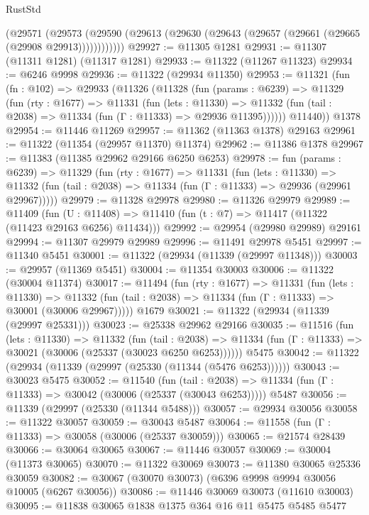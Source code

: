 \begin{lexlean}{RustStd}
\begin{coremodule}
        (@29571
          (@29573 (@29590 (@29613 (@29630 (@29643 (@29657 (@29661 (@29665 (@29908 @29913))))))))))))
@29927 := @11305 @1281
@29931 := @11307 (@11311 @1281) (@11317 @1281)
@29933 := @11322 (@11267 @11323)
@29934 := @6246 @9998
@29936 := @11322 (@29934 @11350)
@29953 := @11321
    (fun (fn : @102) =>
    @29933
      (@11326
        (@11328
          (fun (params : @6239) =>
          @11329
            (fun (rty : @1677) =>
            @11331
              (fun (lets : @11330) =>
              @11332 (fun (tail : @2038) => @11334 (fun (Γ : @11333) => @29936 @11395))))))
        @11440))
    @1378
@29954 := @11446 @11269
@29957 := @11362 (@11363 @1378) @29163
@29961 := @11322 (@11354 (@29957 @11370) @11374)
@29962 := @11386 @1378
@29967 := @11383 (@11385 @29962 @29166 @6250 @6253)
@29978 := fun (params : @6239) =>
  @11329
    (fun (rty : @1677) =>
    @11331
      (fun (lets : @11330) =>
      @11332 (fun (tail : @2038) => @11334 (fun (Γ : @11333) => @29936 (@29961 @29967)))))
@29979 := @11328 @29978
@29980 := @11326 @29979
@29989 := @11409
    (fun (U : @11408) => @11410 (fun (t : @7) => @11417 (@11322 (@11423 @29163 @6256) @11434)))
@29992 := @29954 (@29980 @29989) @29161
@29994 := @11307 @29979 @29989
@29996 := @11491 @29978 @5451
@29997 := @11340 @5451
@30001 := @11322 (@29934 (@11339 (@29997 @11348)))
@30003 := @29957 (@11369 @5451)
@30004 := @11354 @30003
@30006 := @11322 (@30004 @11374)
@30017 := @11494
    (fun (rty : @1677) =>
    @11331
      (fun (lets : @11330) =>
      @11332 (fun (tail : @2038) => @11334 (fun (Γ : @11333) => @30001 (@30006 @29967)))))
    @1679
@30021 := @11322 (@29934 (@11339 (@29997 @25331)))
@30023 := @25338 @29962 @29166
@30035 := @11516
    (fun (lets : @11330) =>
    @11332
      (fun (tail : @2038) =>
      @11334 (fun (Γ : @11333) => @30021 (@30006 (@25337 (@30023 @6250 @6253))))))
    @5475
@30042 := @11322 (@29934 (@11339 (@29997 (@25330 (@11344 (@5476 @6253))))))
@30043 := @30023 @5475
@30052 := @11540
    (fun (tail : @2038) => @11334 (fun (Γ : @11333) => @30042 (@30006 (@25337 (@30043 @6253)))))
    @5487
@30056 := @11339 (@29997 (@25330 (@11344 @5488)))
@30057 := @29934 @30056
@30058 := @11322 @30057
@30059 := @30043 @5487
@30064 := @11558 (fun (Γ : @11333) => @30058 (@30006 (@25337 @30059)))
@30065 := @21574 @28439
@30066 := @30064 @30065
@30067 := @11446 @30057
@30069 := @30004 (@11373 @30065)
@30070 := @11322 @30069
@30073 := @11380 @30065 @25336 @30059
@30082 := @30067 (@30070 @30073) (@6396 @9998 @9994 @30056 @10005 (@6267 @30056))
@30086 := @11446 @30069 @30073 (@11610 @30003)
@30095 := @11838 @30065 @1838 @1375 @364 @16 @11 @5475 @5485 @5477

\end{coremodule}
\end{lexlean}
